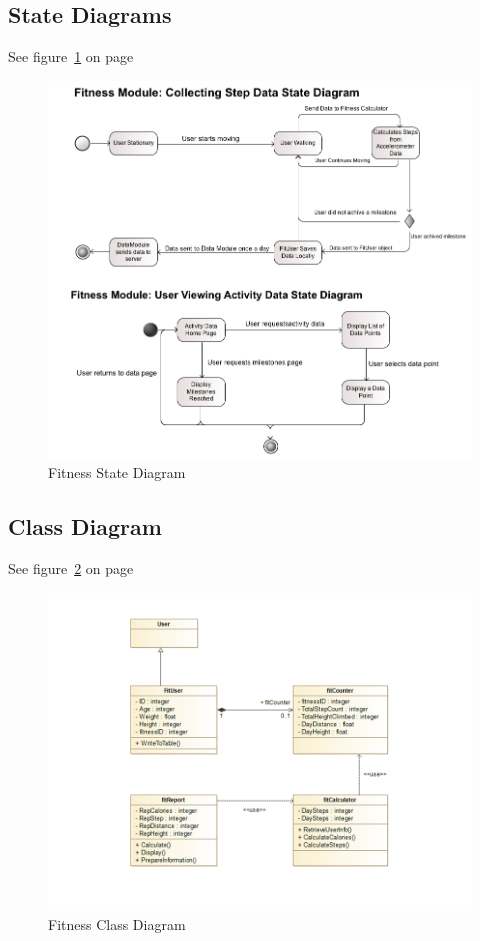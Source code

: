 \subsection{State Diagrams}
See figure~\ref{fig:fitness_state_diagram} on page~\pageref{fig:fitness_state_diagram}
\begin{figure}
	\centering
	\includegraphics[scale=0.54]{Fitness/fitness_state_diagram.png}
	\caption{Fitness State Diagram}
	\label{fig:fitness_state_diagram}
\end{figure}

\subsection{Class Diagram}
See figure~\ref{fig:Fitness_Class_Diagram} on page~\pageref{fig:Fitness_Class_Diagram}
\begin{figure}
	\centering
	\includegraphics[scale=0.54]{Fitness/Fitness_Class_Diagram.png}
	\caption{Fitness Class Diagram}
	\label{fig:Fitness_Class_Diagram}
\end{figure}

